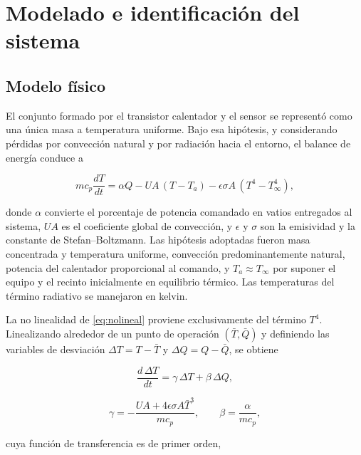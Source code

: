 \documentclass[conference,a4paper,10pt]{IEEEtran}
\begin{document}
\section{Modelado e identificación del sistema}

\subsection{Modelo físico}

El conjunto formado por el transistor calentador y el sensor se representó como una única masa a
temperatura uniforme. Bajo esa hipótesis, y considerando pérdidas por convección natural y por
radiación hacia el entorno, el balance de energía conduce a \cite{hedengren_modeling}

\begin{equation}
m c_p \frac{dT}{dt} = \alpha Q - UA\,(T - T_a) - \epsilon\sigma A\,(T^4 - T_\infty^4),
\label{eq:nolineal}
\end{equation}

donde $\alpha$ convierte el porcentaje de potencia comandado en vatios entregados al sistema, $UA$
es el coeficiente global de convección, y $\epsilon$ y $\sigma$ son la emisividad y la constante de
Stefan--Boltzmann. Las hipótesis adoptadas fueron masa concentrada y temperatura uniforme,
convección predominantemente natural, potencia del calentador proporcional al comando, y
$T_a \approx T_\infty$ por suponer el equipo y el recinto inicialmente en equilibrio térmico. Las
temperaturas del término radiativo se manejaron en kelvin.

La no linealidad de \eqref{eq:nolineal} proviene exclusivamente del término $T^4$. Linealizando
alrededor de un punto de operación $(\bar T, \bar Q)$ y definiendo las variables de desviación
$\Delta T = T - \bar T$ y $\Delta Q = Q - \bar Q$, se obtiene \cite{hedengren_linearize}

\begin{equation}
\frac{d\,\Delta T}{dt} = \gamma\,\Delta T + \beta\,\Delta Q,
\label{eq:lineal}
\end{equation}

\vspace{-3mm}
\begin{equation}
\gamma = -\frac{UA + 4\epsilon\sigma A \bar T^{3}}{m c_p},
\qquad
\beta = \frac{\alpha}{m c_p},
\label{eq:gammabeta}
\end{equation}

cuya función de transferencia es de primer orden,
\end{document}
